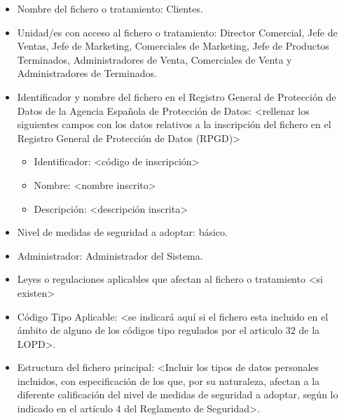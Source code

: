 \documentclass[a4paper,11pt,bibtotoc,noliststotoc]{scrbook}
\begin{document}
\begin{itemize}
\item Nombre del fichero o tratamiento: Clientes.

\item Unidad/es con acceso al fichero o tratamiento: Director Comercial, Jefe de Ventas, Jefe de Marketing, Comerciales de Marketing, Jefe de Productos Terminados, Administradores de Venta, Comerciales de Venta y Administradores de Terminados.

\item Identificador y nombre del fichero en el Registro General de Protección de Datos de la Agencia Española de Protección de Datos: <rellenar los siguientes campos con los datos relativos a la inscripción del fichero en el Registro General de Protección de Datos (RPGD)>
	\begin{itemize}
	\item Identificador: <código de inscripción>
	\item Nombre: <nombre inscrito>
	\item Descripción: <descripción inscrita>
	\end{itemize}

\item Nivel de medidas de seguridad a adoptar: básico.

\item Administrador: Administrador del Sistema.

\item Leyes o regulaciones aplicables que afectan al fichero o tratamiento <si existen>

\item Código Tipo Aplicable: <se indicará aquí si el fichero esta incluido en el ámbito de alguno de los códigos tipo regulados por el articulo 32 de la LOPD>.

\item Estructura del fichero principal: <Incluir los tipos de datos personales incluidos, con especificación de los que, por su naturaleza, afectan a la diferente calificación del nivel de medidas de seguridad a adoptar, según lo indicado en el artículo 4 del Reglamento de Seguridad>.


\end{itemize}
\end{document}
